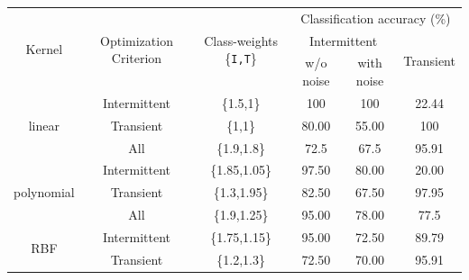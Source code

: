 \begin{table}[h]
\captionsetup{justification=centering}
\begin{tabular}{cccccc}
\hline
\multirow{3}{*}{Kernel}     & \multirow{3}{*}{Optimization Criterion} & \multirow{3}{*}{Class-weights \{\texttt{I,T}\}} & \multicolumn{3}{c}{Classification accuracy (\%)}              \\ \cline{4-6} 
                            &                                         &                                                   & \multicolumn{2}{c}{Intermittent} & \multirow{2}{*}{Transient} \\ \cline{4-5}
                            &                                         &                                                   & w/o noise      & with noise      &                            \\ \hline
\multirow{3}{*}{linear}     & Intermittent                            & \{1.5,1\}                                         & 100            & 100             & 22.44                      \\
                            & Transient                               & \{1,1\}                                           & 80.00          & 55.00           & 100                        \\

                            & All                               & \{1.9,1.8\}                                           & 72.5          & 67.5           & 95.91                        \\
\hline
\multirow{3}{*}{polynomial} & Intermittent                            & \{1.85,1.05\}                                     & 97.50          & 80.00           & 20.00                      \\
                            & Transient                               & \{1.3,1.95\}                                      & 82.50          & 67.50           & 97.95                      \\

                            & All                               & \{1.9,1.25\}                                           & 95.00          & 78.00           & 77.5                        \\
\hline
\multirow{3}{*}{RBF}        & Intermittent                            & \{1.75,1.15\}                                     & 95.00          & 72.50           & 89.79                      \\
                            & Transient                               & \{1.2,1.3\}                                       & 72.50          & 70.00           & 95.91                      \\


\end{tabular}
\end{table}

